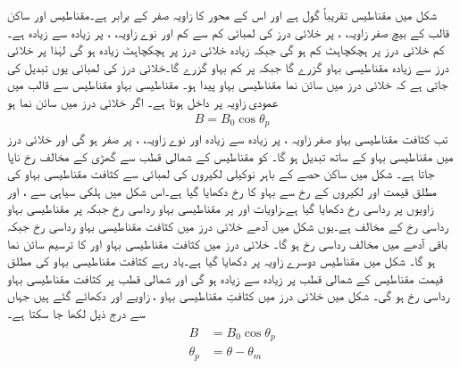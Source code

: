  شکل   میں مقناطیس تقریباً گول ہے اور اس کے محور کا زاویہ  صفر کے برابر ہے۔مقناطیس اور ساکن قالب کے بیچ صفر زاویہ،   ، پر خلائی درز کی لمبائی کم سے کم اور نوے  زاویہ،  ، پر زیادہ سے زیادہ ہے۔کم خلائی درز پر ہچکچاہٹ کم ہو گی جبکہ زیادہ خلائی درز  پر ہچکچاہٹ زیادہ ہو گی لہٰذا  پر خلائی درز سے زیادہ مقناطیسی بہاو گزرے گا جبکہ  پر کم بہاو گزرے گا۔خلائی درز کی لمبائی یوں تبدیل کی جاتی  ہے کہ  خلائی درز میں سائن نما مقناطیسی بہاو پیدا ہو۔ مقناطیسی بہاو مقناطیس سے قالب میں عمودی زاویہ پر داخل ہوتا ہے۔  اگر خلائی درز میں  سائن نما ہو
\begin{align}
B=B_0 \cos \theta_p
\end{align}
تب کثافت مقناطیسی بہاو  صفر زاویہ ، پر زیادہ سے زیادہ اور نوے زاویہ،  ، پر صفر ہو گی اور خلائی درز میں مقناطیسی بہاو   کے ساتھ تبدیل ہو گا۔ کو مقناطیس کے شمالی قطب  سے گھڑی کے مخالف رخ ناپا جاتا ہے۔  شکل   میں  ساکن حصے کے باہر نوکیلی لکیروں کی لمبائی  سے  کثافت مقناطیسی بہاو کی مطلق قیمت اور لکیروں کے رخ سے بہاو کا رخ دکھایا گیا ہے۔اس شکل میں ہلکی سیاہی سے ،  اور  زاویوں پر رداسی رخ  دکھایا گیا ہے۔زاویات  اور    پر مقناطیسی بہاو رداسی رخ  جبکہ   پر مقناطیسی بہاو رداسی رخ کے مخالف ہے۔یوں شکل  میں  آدھے خلائی درز میں کثافت مقناطیسی بہاو  رداسی رخ جبکہ باقی آدھے میں مخالف رداسی رخ ہو گا۔ خلائی درز میں کثافت مقناطیسی بہاو  اور   کا ترسیم  سائن نما ہو گا۔ شکل   میں مقناطیس دوسرے زاویہ پر دکھایا گیا ہے۔یاد رہے کثافت مقناطیسی بہاو کی مطلق قیمت  مقناطیس کے شمالی قطب پر زیادہ سے زیادہ ہو گی اور شمالی قطب پر کثافت مقناطیسی بہاو رداسی رخ ہو گی۔ شکل  میں خلائی درز میں کثافتِ مقناطیسی بہاو ، زاویے  اور  دکھائے گئے ہیں جہاں سے درج ذیل لکھا جا سکتا ہے۔
\begin{gather}
\begin{aligned}\label{مساوات_گھومتے_مشین_کثافت_بالمقابل_میکانی_زاویہ}
B&=B_0 \cos \theta_p\\
\theta_p&=\theta-\theta_m
\end{aligned}
\end{gather}
